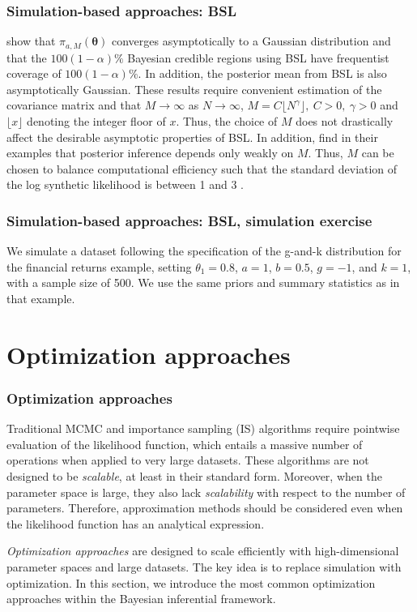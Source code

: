 \documentclass[12pt, compress]{beamer}
\begin{document}
\begin{frame}
	\frametitle{Simulation-based approaches: BSL}
    \cite{nott2023bayesian} show that \( \pi_{a,M}(\boldsymbol{\theta}) \) converges asymptotically to a Gaussian distribution and that the \( 100(1-\alpha)\% \) Bayesian credible regions using BSL have frequentist coverage of \( 100(1-\alpha)\% \). In addition, the posterior mean from BSL is also asymptotically Gaussian. These results require convenient estimation of the covariance matrix and that \( M \to \infty \) as \( N \to \infty \), $M=C\lfloor N^{\gamma} \rfloor, \ C>0, \ \gamma > 0$ and $\lfloor x \rfloor$ denoting the integer floor of $x$. Thus, the choice of \( M \) does not drastically affect the desirable asymptotic properties of BSL. In addition, \cite{price2018bayesian} find in their examples that posterior inference depends only weakly on \( M \). Thus, \( M \) can be chosen to balance computational efficiency such that the standard deviation of the log synthetic likelihood is between 1 and 3 \citep{an2019accelerating}. 


\end{frame}

\begin{frame}
	\frametitle{Simulation-based approaches: BSL, simulation exercise}
    We simulate a dataset following the specification of the g-and-k distribution for the financial returns example, setting $\theta_1 = 0.8$, $a = 1$, $b = 0.5$, $g = -1$, and $k = 1$, with a sample size of 500. We use the same priors and summary statistics as in that example.
\end{frame}

\section{Optimization approaches}
\begin{frame}
	\frametitle{Optimization approaches}
Traditional MCMC and importance sampling (IS) algorithms require pointwise evaluation of the likelihood function, which entails a massive number of operations when applied to very large datasets. These algorithms are not designed to be \textit{scalable}, at least in their standard form. Moreover, when the parameter space is large, they also lack \textit{scalability} with respect to the number of parameters. Therefore, approximation methods should be considered even when the likelihood function has an analytical expression.

\textit{Optimization approaches} are designed to scale efficiently with high-dimensional parameter spaces and large datasets. The key idea is to replace simulation with optimization. In this section, we introduce the most common optimization approaches within the Bayesian inferential framework.
\end{frame}
\end{document}
